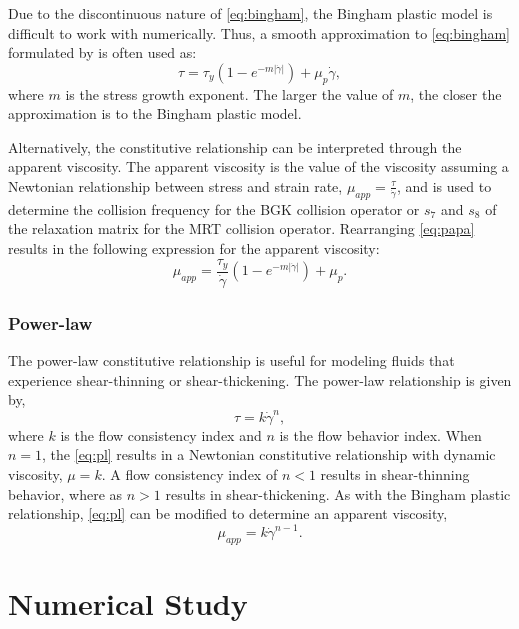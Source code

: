 \documentclass{article}
\begin{document}
Due to the discontinuous nature of \eqref{eq:bingham}, the Bingham plastic model is difficult to work with numerically.
Thus, a smooth approximation to \eqref{eq:bingham} formulated by \citet{papanastasiou1987flows} is often used as:
\begin{equation} \label{eq:papa}
\tau = \tau_y (1 - e^{-m |\dot{\gamma}|}) + \mu_p \dot{\gamma},
\end{equation}
\noindent where $m$ is the stress growth exponent.
The larger the value of $m$, the closer the approximation is to the Bingham plastic model.

Alternatively, the constitutive relationship can be interpreted through the apparent viscosity.
The apparent viscosity is the value of the viscosity assuming a Newtonian relationship between stress and strain rate, $\mu_{app} = \frac{\tau}{\dot{\gamma}}$, and is used to determine the collision frequency for the BGK collision operator or $s_7$ and $s_8$ of the relaxation matrix for the MRT collision operator.
Rearranging \eqref{eq:papa} results in the following expression for the apparent viscosity:
\begin{equation} \label{eq:bing-mu-app}
\mu_{app} = \frac{\tau_y}{\dot{\gamma}} (1 - e^{-m |\dot{\gamma}|}) + \mu_p.
\end{equation}

\subsubsection{Power-law}

The power-law constitutive relationship is useful for modeling fluids that experience shear-thinning or shear-thickening.
The power-law relationship is given by,
\begin{equation} \label{eq:pl}
\tau = k \dot{\gamma}^n,
\end{equation}
\noindent where $k$ is the flow consistency index and $n$ is the flow behavior index.
When $n = 1$, the \eqref{eq:pl} results in a Newtonian constitutive relationship with dynamic viscosity, $\mu = k$.
A flow consistency index of $n < 1$ results in shear-thinning behavior, where as $n > 1$ results in shear-thickening.
As with the Bingham plastic relationship, \eqref{eq:pl} can be modified to determine an apparent viscosity,
\begin{equation} \label{eq:pl-mu-app}
\mu_{app} = k \dot{\gamma}^{n-1}.
\end{equation}

\section{Numerical Study}
\end{document}
